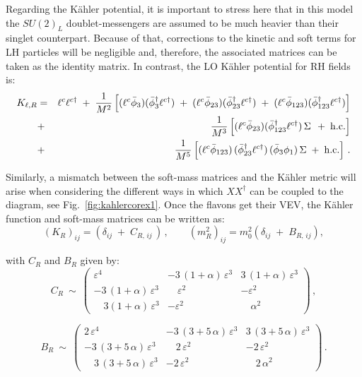 \documentclass[a4paper,11pt]{article}
\newcommand{\bea}{\begin{eqnarray}}
\newcommand{\beq}{\begin{equation}}
\newcommand{\eea}{\end{eqnarray}}
\newcommand{\eeq}{\end{equation}}
\newcommand{\vep}{\varepsilon}
\newcommand{\nn}{\nonumber}
\begin{document}
Regarding the K\"ahler potential, it is important to stress here that in this model the $SU(2)_L$ doublet-messengers are assumed to be much heavier than their singlet counterpart. Because of that, corrections to the kinetic and soft terms for LH particles will be negligible and, therefore, the associated matrices can be taken as the identity matrix. In contrast, the LO K\"ahler potential for RH fields is:
\bea
  K_{\ell,R} & = & \ell^{c}\ell^{c\dagger} \;+\; \frac{1}{M^2}\left[( \ell^c \bar\phi_3)(\bar\phi_{3}^\dagger \ell^{c\dagger})\;+\; ( \ell^c \bar\phi_{23})(\bar\phi_{23}^\dagger \ell^{c\dagger}) \;+\; 
  ( \ell^c \bar\phi_{123})(\bar\phi_{123}^\dagger \ell^{c\dagger}) \right] \\
    & + & \frac{1}{M^3}\left[ ( \ell^c \bar\phi_{23})(\bar\phi_{123}^\dagger \ell^{c\dagger})\,\Sigma\, \;+\; {\rm h.c.} \right] \\
   & + &  \frac{1}{M^5} \left[ ( \ell^c \bar\phi_{123})\,(\bar\phi_{23}^\dagger \ell^{c\dagger})\,(\bar\phi_{3}\phi_1)\,\Sigma \;+\; {\rm 
    h.c.}\right] \, .\nn
\eea

Similarly, a mismatch between the soft-mass matrices and the K\"ahler metric will arise when considering the different ways in which $X X^\dagger$ can be coupled to the diagram, see Fig.~\ref{fig:kahlercorex1}. Once the flavons get their VEV, the K\"ahler function and soft-mass matrices can be written as:
\begin{equation} \label{eq:km2}
(K_{R})_{ij} = \left(\delta_{ij} \;+\; C_{R,\, ij}\, \right)\,, \qquad   (m^2_{R})_{ij} = m_0^2 \left(\delta_{ij} \;+\; B_{R,\, ij} \right) ,
\end{equation}

with $C_R$ and $B_R$ given by:
\beq
  C_R ~\sim~ \left(\begin{array}{ccc}
                             \vep^4 & -3\,(1+\alpha)\, \vep^3 & 3\,(1+\alpha)\, \vep^3 \\
              -3\,(1+\alpha)\, \vep^3 &          \quad \vep^2 &              -\vep^2 \\
            \quad3(1+\alpha)\, \vep^3 &               -\vep^2 &   \quad       \alpha^2 
             \end{array} \right)\, ,
\eeq

\beq \label{eqn:D27BLBR}
  B_R ~\sim~ \left(\begin{array}{ccc}
                    2\, \vep^4 & -3\,(3+5\,\alpha)\, \vep^3 & 3\,(3+5\,\alpha)\, \vep^3 \\
            -3\,(3+5\,\alpha)\, \vep^3 &   \quad 2\, \vep^2 & -2\, \vep^2 \\           
            \quad 3\,(3+5\,\alpha)\, \vep^3 &   -2\, \vep^2 & \quad    2\, \alpha^2              
             \end{array} \right) \,.
\eeq
\end{document}
